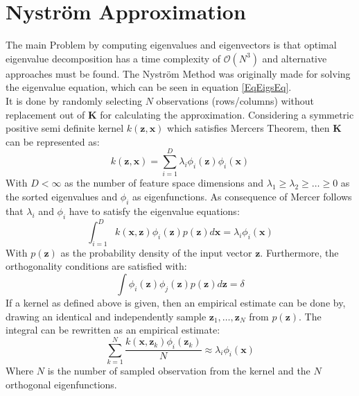 \section{Nyström Approximation}\label{InSecNysMeth}
The main Problem by computing eigenvalues and eigenvectors is that optimal eigenvalue decomposition has a time complexity of $\mathcal{O}(N^3)$ and alternative approaches must be found.
The Nyström Method was originally made for solving the eigenvalue equation, which can be seen in equation \eqref{EqEigsEq}.\cite{Zhang.2008}\\
It is done by randomly selecting $N$ observations (rows/columns) without replacement out of $\mathbf{K}$ for calculating the approximation.\cite{Williams.2000}
Considering a symmetric positive semi definite kernel $k(\mathbf{z},\mathbf{x})$ which satisfies Mercers Theorem, then $\mathbf{K}$ can be represented as:\cite{Williams.2000}
\begin{equation}\label{EqKernelRep}
	k(\mathbf{z},\mathbf{x}) = \sum_{i=1}^{D}\lambda_i\phi_i(\mathbf{z})\phi_i(\mathbf{x}) 
\end{equation}
With $D < \infty$ as the number of feature space dimensions and $\lambda_1 \ge \lambda_2\ge\dots\ge0$ as the sorted eigenvalues and $\phi_i$ as eigenfunctions.
As consequence of Mercer follows that  $\lambda_i$ and $\phi_i$ have to satisfy the eigenvalue equations:
 \begin{equation}\label{EqEigsEq}
	\int_{i=1}^{D} k(\mathbf{x},\mathbf{z})\phi_i(\mathbf{z})p(\mathbf{z})d\mathbf{x} = \lambda_i\phi_i(\mathbf{x})
\end{equation}
With $p(\mathbf{z})$ as the probability density of the input vector $\mathbf{z}$.
Furthermore, the orthogonality conditions are satisfied with:\cite[p. 59]{Scholkopf.2001}
\begin{equation}\label{EqEigsOrt}
	\int \phi_i(\mathbf{z})\phi_j(\mathbf{z})p(\mathbf{z})d\mathbf{z} = \delta
\end{equation}
If a kernel as defined above is given, then an empirical estimate can be done by, drawing an identical and independently sample ${\mathbf{z}_1,\dots,\mathbf{z}_N}$ from $p(\mathbf{z})$.
The integral can be rewritten as an empirical estimate:\cite{Williams.2000}
\begin{equation}\label{EqEigsEmp}
	\sum_{k=1}^{N}\frac{k(\mathbf{x},\mathbf{z}_k)\phi_i(\mathbf{z}_k)}{N} \approx \lambda_i\phi_i(\mathbf{x})
\end{equation}
Where $N$ is the number of sampled observation from the kernel and the $N$ orthogonal eigenfunctions.
